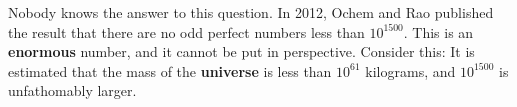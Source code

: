 \documentclass{ximera}
\begin{document}
Nobody knows the answer to this question. In 2012, Ochem and Rao
published the result that there are no odd perfect numbers less than
$10^{1500}$. This is an \textbf{enormous} number, and it cannot be put
in perspective. Consider this: It is estimated that the mass of the
\textbf{universe} is less than $10^{61}$ kilograms, and $10^{1500}$ is
unfathomably larger.
\end{document}
